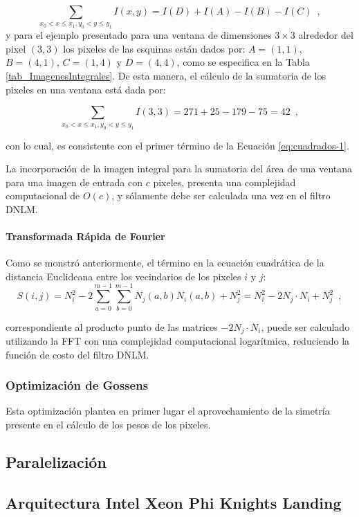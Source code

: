 \begin{equation}
\sum_{x_{0}<x\leq x_{1},y_{0}<y\leq y_{1}}I\left(x,y\right)=I\left(D\right)+I\left(A\right)-I\left(B\right)-I\left(C\right) \enspace ,
\end{equation}
y para el ejemplo presentado para una ventana de dimensiones $3\times3$ alrededor del pixel $(3,3)$ los pixeles de las esquinas est\'an dados por: $A=\left(1,1\right)$, $B=\left(4,1\right)$,
$C=\left(1,4\right)$ y $D=\left(4,4\right)$, como se especifica en la Tabla \ref{tab_ImagenesIntegrales}. De esta manera, el c\'alculo de la sumatoria de los pixeles en una ventana est\'a dada por: 

\begin{equation}
\sum_{x_{0}<x\leq x_{1},y_{0}<y\leq y_{1}}I\left(3,3\right)=271+25-179-75=42 \enspace ,
\end{equation}

con lo cual, es consistente con el primer t\'ermino de la Ecuaci\'on \ref{eq:cuadrados-1}. 

La incorporaci\'on de la imagen integral para la sumatoria del \'area de una ventana para una imagen de entrada con $c$ pixeles, presenta una complejidad computacional de $O(c)$, y s\'olamente debe ser calculada una vez en el filtro DNLM.


\paragraph{Transformada R\'apida de Fourier}

Como se monstr\'o anteriormente, el t\'ermino en la ecuaci\'on cuadr\'atica de la distancia Euclideana entre los vecindarios de los pixeles $i$ y $j$:
\begin{equation}
S\left(i,j\right)=N_{i}^{2}-2\sum_{a=0}^{m-1}\sum_{b=0}^{m-1}N_{j}\left(a,b\right)N_{i}\left(a,b\right)+N_{j}^{2} =N_{i}^{2}-2N_{j}\cdot N_{i}+N_{j}^{2} \enspace , 
\end{equation}



correspondiente al producto punto de las matrices $-2N_{j}\cdot N_{i}$,  puede ser calculado utilizando la FFT con una complejidad computacional logar\'itmica, reduciendo la funci\'on de costo del filtro DNLM. 



\subsubsection{Optimizaci\'on de Gossens}
\label{ch:marco_gossens}


Esta optimizaci\'on plantea en primer lugar el aprovechamiento de la simetr\'ia presente en el c\'alculo de los pesos de los pixeles. 

\subsection{Paralelizaci\'on}
\label{ch:marco_parallel}

\subsection{Arquitectura Intel Xeon Phi Knights Landing}
\label{ch:marco_xeonphi}